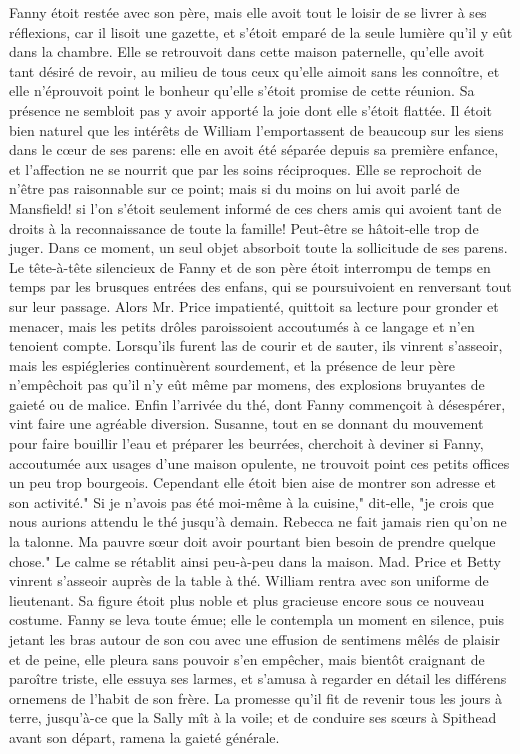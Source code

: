 Fanny étoit restée avec son père, mais elle avoit tout le loisir de se livrer à ses réflexions, car il lisoit une gazette, et s'étoit emparé de la seule lumière qu'il y eût dans la chambre. Elle se retrouvoit dans cette maison paternelle, qu'elle avoit tant désiré de revoir, au milieu de tous ceux qu'elle aimoit sans les connoître, et elle n'éprouvoit point le bonheur qu'elle s'étoit promise de cette réunion. Sa présence ne sembloit pas y avoir apporté la joie dont elle s'étoit flattée. Il étoit bien naturel que les intérêts de William l'emportassent de beaucoup sur les siens dans le cœur de ses parens: elle en avoit été séparée depuis sa première enfance, et l'affection ne se nourrit que par les soins réciproques.\setcounter{page}{389} Elle se reprochoit de n'être pas raisonnable sur ce point; mais si du moins on lui avoit parlé de Mansfield! si l'on s'étoit seulement informé de ces chers amis qui avoient tant de droits à la reconnaissance de toute la famille! Peut-être se hâtoit-elle trop de juger. Dans ce moment, un seul objet absorboit toute la sollicitude de ses parens. Le tête-à-tête silencieux de Fanny et de son père étoit interrompu de temps en temps par les brusques entrées des enfans, qui se poursuivoient en renversant tout sur leur passage. Alors Mr. Price impatienté, quittoit sa lecture pour gronder et menacer, mais les petits drôles paroissoient accoutumés à ce langage et n'en tenoient compte. Lorsqu'ils furent las de courir et de sauter, ils vinrent s'asseoir, mais les espiégleries continuèrent sourdement, et la présence de leur père n'empêchoit pas qu'il n'y eût même par momens, des explosions bruyantes de gaieté ou de malice. Enfin l'arrivée du thé, dont Fanny commençoit à désespérer, vint faire une agréable diversion. Susanne, tout en se donnant du mouvement pour faire bouillir l'eau et préparer les beurrées, cherchoit à deviner si Fanny, accoutumée aux usages d'une maison opulente, ne trouvoit point ces petits\setcounter{page}{390} offices un peu trop bourgeois. Cependant elle étoit bien aise de montrer son adresse et son activité." Si je n'avois pas été moi-même à la cuisine," dit-elle, "je crois que nous aurions attendu le thé jusqu'à demain. Rebecca ne fait jamais rien qu'on ne la talonne. Ma pauvre sœur doit avoir pourtant bien besoin de prendre quelque chose."
Le calme se rétablit ainsi peu-à-peu dans la maison. Mad. Price et Betty vinrent s'asseoir auprès de la table à thé. William rentra avec son uniforme de lieutenant. Sa figure étoit plus noble et plus gracieuse encore sous ce nouveau costume. Fanny se leva toute émue; elle le contempla un moment en silence, puis jetant les bras autour de son cou avec une effusion de sentimens mêlés de plaisir et de peine, elle pleura sans pouvoir s'en empêcher, mais bientôt craignant de paroître triste, elle essuya ses larmes, et s'amusa à regarder en détail les différens ornemens de l'habit de son frère. La promesse qu'il fit de revenir tous les jours à terre, jusqu'à-ce que la Sally mît à la voile; et de conduire ses sœurs à Spithead avant son départ, ramena la gaieté générale.

